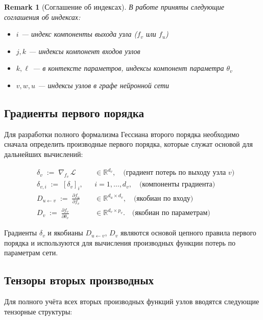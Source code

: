 \documentclass[11pt]{article}
\newtheorem{remark}{Remark}
\begin{document}
\begin{remark}[Соглашение об индексах]
  В работе приняты следующие соглашения об индексах:
  \begin{itemize}
    \item $i$ — индекс компоненты выхода узла ($f_v$ или $f_u$)
    \item $j, k$ — индексы компонент входов узлов
    \item $k, \ell$ — в контексте параметров, индексы компонент параметра $\theta_v$
    \item $v, w, u$ — индексы узлов в графе нейронной сети
  \end{itemize}
\end{remark}

\subsection{Градиенты первого порядка}

Для разработки полного формализма Гессиана второго порядка необходимо сначала определить производные первого
порядка, которые служат основой для дальнейших вычислений:

\begin{align*}
  &\delta_v \;:=\; \nabla_{f_v}\,\mathcal L
  &&\in\mathbb{R}^{d_v}, \quad \text{(градиент потерь по выходу узла $v$)}
  \\[-2pt]
  &\delta_{v,i} \;:=\; [\delta_v]_i,
  &&i=1,\dots,d_v, \quad \text{(компоненты градиента)}
  \\[3pt]
  &D_{u\gets v}
  \;:=\;\frac{\partial f_u}{\partial f_v}
  &&\in\mathbb{R}^{d_u\times d_v}, \quad \text{(якобиан по входу)}
  \\[-2pt]
  &D_v
  \;:=\;\frac{\partial f_v}{\partial\theta_v}
  &&\in\mathbb{R}^{d_v\times p_v}. \quad \text{(якобиан по параметрам)}
\end{align*}

Градиенты $\delta_v$ и якобианы $D_{u\gets v}$, $D_v$ являются основой цепного правила первого порядка и
используются для вычисления производных функции потерь по параметрам сети.

\subsection{Тензоры вторых производных}

Для полного учёта всех вторых производных функций узлов вводятся следующие тензорные структуры:
\end{document}
